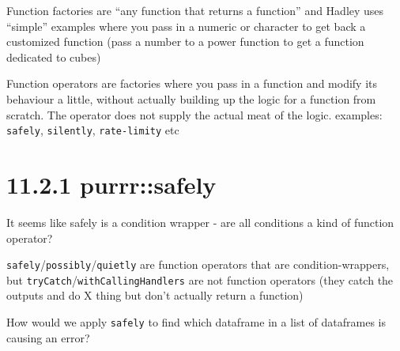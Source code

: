 \documentclass[]{book}
\begin{document}
Function factories are ``any function that returns a function'' and Hadley uses ``simple'' examples where you pass in a numeric or character to get back a customized function (pass a number to a power function to get a function dedicated to cubes)

Function operators are factories where you pass in a function and modify its behaviour a little, without actually building up the logic for a function from scratch. The operator does not supply the actual meat of the logic.
examples: \texttt{safely}, \texttt{silently}, \texttt{rate-limity} etc

\hypertarget{purrrsafely}{%
\section*{11.2.1 purrr::safely}\label{purrrsafely}}

It seems like safely is a condition wrapper - are all conditions a kind of function operator?

\texttt{safely}/\texttt{possibly}/\texttt{quietly} are function operators that are condition-wrappers, but \texttt{tryCatch}/\texttt{withCallingHandlers} are not function operators (they catch the outputs and do X thing but don't actually return a function)

How would we apply \texttt{safely} to find which dataframe in a list of dataframes is causing an error?
\end{document}
